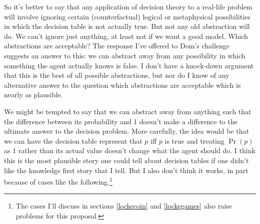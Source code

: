 \documentclass[11pt,]{book}
\let\rmarkdownfootnote\footnote%
\def\footnote{\protect\rmarkdownfootnote}
\begin{document}
So it's better to say that any application of decision theory to a real-life problem will involve ignoring certain (counterfactual) logical or metaphysical possibilities in which the decision table is not actually true. But not any old abstraction will do. We can't ignore just anything, at least not if we want a good model. Which abstractions are acceptable? The response I've offered to Dom's challenge suggests an answer to this: we can abstract away from any possibility in which something the agent actually knows is false. I don't have a knock-down argument that this is the best of all possible abstractions, but nor do I know of any alternative answer to the question which abstractions are acceptable which is nearly as plausible.

We might be tempted to say that we can abstract away from anything such that the difference between its probability and 1 doesn't make a difference to the ultimate answer to the decision problem. More carefully, the idea would be that we can have the decision table represent that \(p\) iff \(p\) is true and treating \(\Pr(p)\) as 1 rather than its actual value doesn't change what the agent should do. I think this is the most plausible story one could tell about decision tables if one didn't like the knowledge first story that I tell. But I also don't think it works, in part because of cases like the following.\footnote{The cases I'll discuss in sections \ref{lockecoin} and \ref{lockegames} also raise problems for this proposal.}
\end{document}
